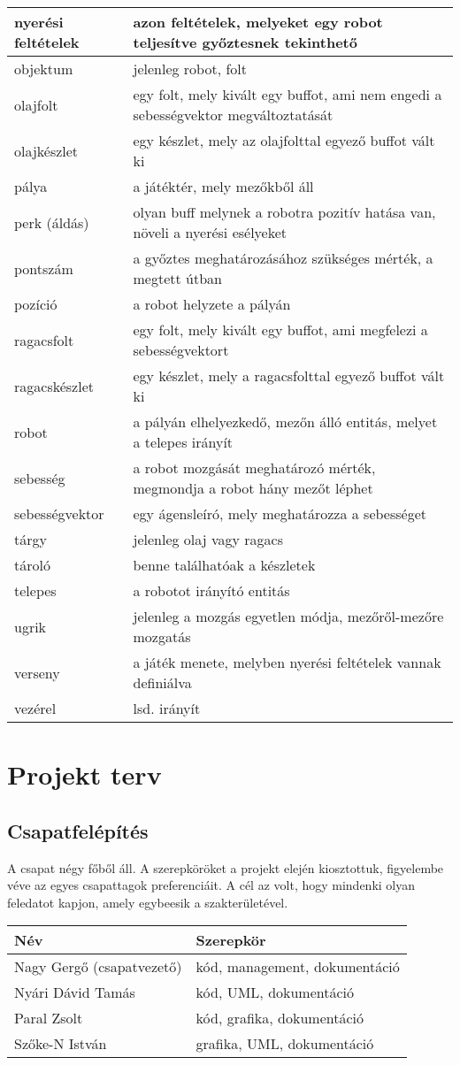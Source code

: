 \begin{tabularx}{\textwidth}{| l | l |}
    nyerési feltételek &  azon feltételek, melyeket egy robot teljesítve győztesnek tekinthető \tabularnewline \hline
    objektum &  jelenleg robot, folt \tabularnewline \hline
    olajfolt &  egy folt, mely kivált egy buffot, ami nem engedi a sebességvektor megváltoztatását \tabularnewline \hline
    olajkészlet &  egy készlet, mely az olajfolttal egyező buffot vált ki \tabularnewline \hline
    pálya &  a játéktér, mely mezőkből áll \tabularnewline \hline
    perk (áldás) & olyan buff melynek a robotra pozitív hatása van, növeli a nyerési esélyeket  \tabularnewline \hline
    pontszám &  a győztes meghatározásához szükséges mérték, a megtett útban \tabularnewline \hline
    pozíció &  a robot helyzete a pályán \tabularnewline \hline
    ragacsfolt &  egy folt, mely kivált egy buffot, ami megfelezi a sebességvektort \tabularnewline \hline
    ragacskészlet &  egy készlet, mely a ragacsfolttal egyező buffot vált ki \tabularnewline \hline
    robot &  a pályán elhelyezkedő, mezőn álló entitás, melyet a telepes irányít \tabularnewline \hline
    sebesség &  a robot mozgását meghatározó mérték, megmondja a robot hány mezőt léphet \tabularnewline \hline
    sebességvektor &  egy ágensleíró, mely meghatározza a sebességet \tabularnewline \hline
    tárgy & jelenleg olaj vagy ragacs   \tabularnewline \hline
    tároló &  benne találhatóak a készletek \tabularnewline \hline
    telepes &  a robotot irányító entitás \tabularnewline \hline
    ugrik &  jelenleg a mozgás egyetlen módja, mezőről-mezőre mozgatás \tabularnewline \hline
    verseny &  a játék menete, melyben nyerési feltételek vannak definiálva \tabularnewline \hline
    vezérel & lsd. irányít \tabularnewline \hline
\end{tabularx}

\section{Projekt terv}
\subsection{Csapatfelépítés}
A csapat négy főből áll. A szerepköröket a projekt elején kiosztottuk, figyelembe véve az egyes csapattagok preferenciáit. A cél az volt, hogy mindenki olyan feledatot kapjon, amely egybeesik a szakterületével.

\begin{tabularx}{\textwidth}{| l | l |}
\hline
\textbf{Név} & \textbf{Szerepkör} \tabularnewline 
\hline\hline
Nagy Gergő (csapatvezető) & kód, management, dokumentáció \tabularnewline \hline
Nyári Dávid Tamás & kód, UML, dokumentáció \tabularnewline \hline
Paral Zsolt & kód, grafika, dokumentáció \tabularnewline \hline
Szőke-N István & grafika, UML, dokumentáció \tabularnewline \hline
\end{tabularx}

